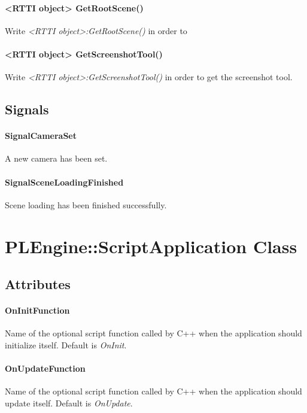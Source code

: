 \paragraph{<RTTI object> GetRootScene()}
Write \emph{<RTTI object>:GetRootScene()} in order to 

\paragraph{<RTTI object> GetScreenshotTool()}
Write \emph{<RTTI object>:GetScreenshotTool()} in order to get the screenshot tool.


\subsection{Signals}

\paragraph{SignalCameraSet}
A new camera has been set.

\paragraph{SignalSceneLoadingFinished}
Scene loading has been finished successfully.




\section{PLEngine::ScriptApplication Class}


\subsection{Attributes}

\paragraph{OnInitFunction}
Name of the optional script function called by C++ when the application should initialize itself. Default is \emph{OnInit}.

\paragraph{OnUpdateFunction}
Name of the optional script function called by C++ when the application should update itself. Default is \emph{OnUpdate}.

